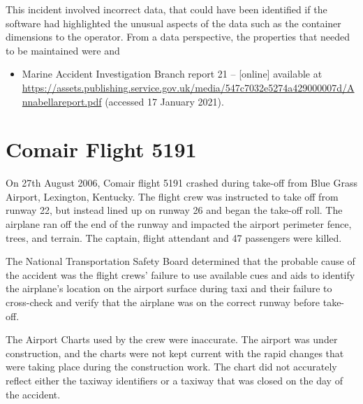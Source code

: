 This incident involved incorrect data, that could have been identified if the software had highlighted the unusual aspects of the data such as the container dimensions to the operator. From a data perspective, the properties that needed to be maintained were  and 

\begin{itemize}
\item Marine Accident Investigation Branch report 21 --  [online] available at \href{https://assets.publishing.service.gov.uk/media/547c7032e5274a429000007d/Annabellareport.pdf}{https://assets.publishing.service.gov.uk/media/547c7032e5274a429000007d/Annabellareport.pdf} (accessed 17 January 2021).
\end{itemize}

\section{Comair Flight 5191} \label{bkm:incacc:comair5191}
On 27th August 2006, Comair flight 5191 crashed during take-off from Blue Grass Airport, Lexington, Kentucky. The flight crew was instructed to take off from runway 22, but instead lined up on runway 26 and began the take-off roll. The airplane ran off the end of the runway and impacted the airport perimeter fence, trees, and terrain. The captain, flight attendant and 47 passengers were killed.

The National Transportation Safety Board determined that the probable cause of the accident was the flight crews' failure to use available cues and aids to identify the airplane's location on the airport surface during taxi and their failure to cross-check and verify that the airplane was on the correct runway before take-off.

The Airport Charts used by the crew were inaccurate. The airport was under construction, and the charts were not kept current with the rapid changes that were taking place during the construction work. The chart did not accurately reflect either the taxiway identifiers or a taxiway that was closed on the day of the accident.

